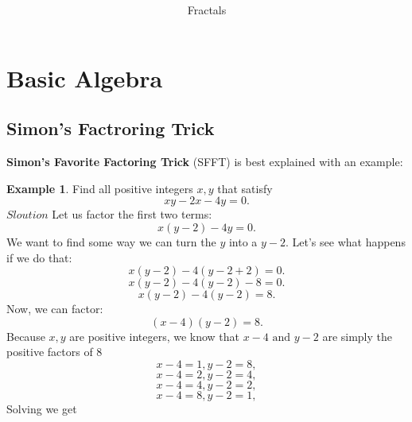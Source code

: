 \documentclass[a4paper]{article}
\theoremstyle{definition}
\newtheorem{exmp}{Example}[section]
\begin{document}
\author{Fractals}
\title{\textbf{}}
\maketitle
\tableofcontents
\noindent
\section{Basic Algebra}
\subsection{Simon's Factroring Trick}
\textbf{Simon’s Favorite Factoring Trick} (SFFT) is best explained with an example:
\begin{exmp}
    Find all positive integers \(x, y\) that satisfy
    \[
        xy- 2x - 4y = 0.
    \]
    \(Sloution\) Let us factor the first two terms:
    \[
        x(y-2) - 4y = 0.
    \]
    We want to find some way we can turn the \(y\) into a \(y - 2\). Let’s see what
    happens if we do that:
    \[
        x(y-2) - 4(y-2+2) = 0.
    \]
    \[
        x(y-2) - 4(y-2)  - 8= 0.
    \]
    \[
        x(y-2) - 4(y-2) = 8.
    \]
    Now, we can factor:
    \[
        (x-4)(y-2) = 8.
    \]
    Because \(x, y\) are positive integers,
    we know that \(x - 4 \text{ and } y - 2\) are simply the positive factors of 8
    \[
        x-4 = 1, y-2=8,
    \]
    \[
        x-4 = 2, y-2=4,
    \]
    \[
        x-4 = 4, y-2=2,
    \]
    \[
        x-4 = 8, y-2=1,
    \]
    Solving we get 
\end{exmp}
\end{document}

